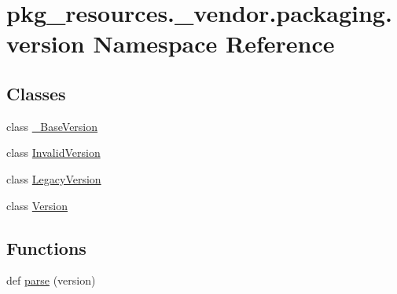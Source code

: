 \hypertarget{namespacepkg__resources_1_1__vendor_1_1packaging_1_1version}{}\section{pkg\+\_\+resources.\+\_\+vendor.\+packaging.\+version Namespace Reference}
\label{namespacepkg__resources_1_1__vendor_1_1packaging_1_1version}
\subsection*{Classes}
\begin{DoxyCompactItemize}
\item 
class \hyperlink{classpkg__resources_1_1__vendor_1_1packaging_1_1version_1_1__BaseVersion}{\+\_\+\+Base\+Version}
\item 
class \hyperlink{classpkg__resources_1_1__vendor_1_1packaging_1_1version_1_1InvalidVersion}{Invalid\+Version}
\item 
class \hyperlink{classpkg__resources_1_1__vendor_1_1packaging_1_1version_1_1LegacyVersion}{Legacy\+Version}
\item 
class \hyperlink{classpkg__resources_1_1__vendor_1_1packaging_1_1version_1_1Version}{Version}
\end{DoxyCompactItemize}
\subsection*{Functions}
\begin{DoxyCompactItemize}
\item 
def \hyperlink{namespacepkg__resources_1_1__vendor_1_1packaging_1_1version_a478a09ba4a7b4fe5ac102489cfd64a19}{parse} (version)
\end{DoxyCompactItemize}
